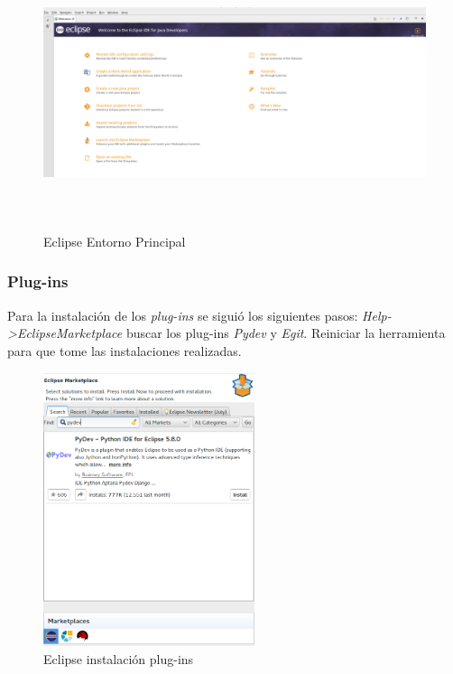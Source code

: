 \begin{figure}[h]
 \centering
  \includegraphics[height=8cm,keepaspectratio=true,clip=true]{imagenes/Apendice/eclipse4.png}
  \caption{Eclipse Entorno Principal}
\end{figure}


\subsubsection*{Plug-ins}
Para la instalación de los \textit{plug-ins} se siguió los siguientes pasos: \textit{Help->EclipseMarketplace} buscar los plug-ins \textit{Pydev} y 
\textit{Egit}. Reiniciar la herramienta para que tome las instalaciones realizadas.
\begin{figure}[h]
 \centering
  \includegraphics[height=8cm,keepaspectratio=true,clip=true]{imagenes/Apendice/eclipse5.png}
  \caption{Eclipse instalación plug-ins}
\end{figure}


